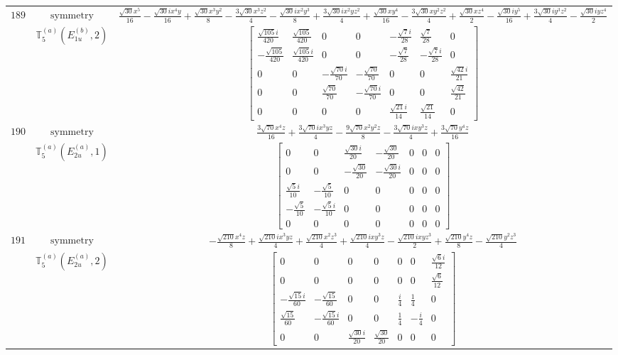 \documentclass[fleqn,8pt,landscape]{jsarticle}
\begin{document}
\begin{longtable}{ccc}
$ 189 $ & $ \text{symmetry} $ & $ \frac{\sqrt{30} x^{5}}{16} - \frac{\sqrt{30} i x^{4} y}{16} + \frac{\sqrt{30} x^{3} y^{2}}{8} - \frac{3 \sqrt{30} x^{3} z^{2}}{4} - \frac{\sqrt{30} i x^{2} y^{3}}{8} + \frac{3 \sqrt{30} i x^{2} y z^{2}}{4} + \frac{\sqrt{30} x y^{4}}{16} - \frac{3 \sqrt{30} x y^{2} z^{2}}{4} + \frac{\sqrt{30} x z^{4}}{2} - \frac{\sqrt{30} i y^{5}}{16} + \frac{3 \sqrt{30} i y^{3} z^{2}}{4} - \frac{\sqrt{30} i y z^{4}}{2} $ \\
$  $ & $ \mathbb{T}_{5}^{(a)}(E_{1u}^{(b)},2) $ & $ \begin{bmatrix} \frac{\sqrt{105} i}{420} & \frac{\sqrt{105}}{420} & 0 & 0 & - \frac{\sqrt{7} i}{28} & \frac{\sqrt{7}}{28} & 0 \\ - \frac{\sqrt{105}}{420} & \frac{\sqrt{105} i}{420} & 0 & 0 & - \frac{\sqrt{7}}{28} & - \frac{\sqrt{7} i}{28} & 0 \\ 0 & 0 & - \frac{\sqrt{70} i}{70} & - \frac{\sqrt{70}}{70} & 0 & 0 & \frac{\sqrt{42} i}{21} \\ 0 & 0 & \frac{\sqrt{70}}{70} & - \frac{\sqrt{70} i}{70} & 0 & 0 & \frac{\sqrt{42}}{21} \\ 0 & 0 & 0 & 0 & \frac{\sqrt{21} i}{14} & \frac{\sqrt{21}}{14} & 0 \end{bmatrix} $ \\ \hline
$ 190 $ & $ \text{symmetry} $ & $ \frac{3 \sqrt{70} x^{4} z}{16} + \frac{3 \sqrt{70} i x^{3} y z}{4} - \frac{9 \sqrt{70} x^{2} y^{2} z}{8} - \frac{3 \sqrt{70} i x y^{3} z}{4} + \frac{3 \sqrt{70} y^{4} z}{16} $ \\
$  $ & $ \mathbb{T}_{5}^{(a)}(E_{2u}^{(a)},1) $ & $ \begin{bmatrix} 0 & 0 & \frac{\sqrt{30} i}{20} & - \frac{\sqrt{30}}{20} & 0 & 0 & 0 \\ 0 & 0 & - \frac{\sqrt{30}}{20} & - \frac{\sqrt{30} i}{20} & 0 & 0 & 0 \\ \frac{\sqrt{5} i}{10} & - \frac{\sqrt{5}}{10} & 0 & 0 & 0 & 0 & 0 \\ - \frac{\sqrt{5}}{10} & - \frac{\sqrt{5} i}{10} & 0 & 0 & 0 & 0 & 0 \\ 0 & 0 & 0 & 0 & 0 & 0 & 0 \end{bmatrix} $ \\ \hline
$ 191 $ & $ \text{symmetry} $ & $ - \frac{\sqrt{210} x^{4} z}{8} + \frac{\sqrt{210} i x^{3} y z}{4} + \frac{\sqrt{210} x^{2} z^{3}}{4} + \frac{\sqrt{210} i x y^{3} z}{4} - \frac{\sqrt{210} i x y z^{3}}{2} + \frac{\sqrt{210} y^{4} z}{8} - \frac{\sqrt{210} y^{2} z^{3}}{4} $ \\
$  $ & $ \mathbb{T}_{5}^{(a)}(E_{2u}^{(a)},2) $ & $ \begin{bmatrix} 0 & 0 & 0 & 0 & 0 & 0 & \frac{\sqrt{6} i}{12} \\ 0 & 0 & 0 & 0 & 0 & 0 & \frac{\sqrt{6}}{12} \\ - \frac{\sqrt{15} i}{60} & - \frac{\sqrt{15}}{60} & 0 & 0 & \frac{i}{4} & \frac{1}{4} & 0 \\ \frac{\sqrt{15}}{60} & - \frac{\sqrt{15} i}{60} & 0 & 0 & \frac{1}{4} & - \frac{i}{4} & 0 \\ 0 & 0 & \frac{\sqrt{30} i}{20} & \frac{\sqrt{30}}{20} & 0 & 0 & 0 \end{bmatrix} $ \\ \hline

\end{longtable}
\end{document}
